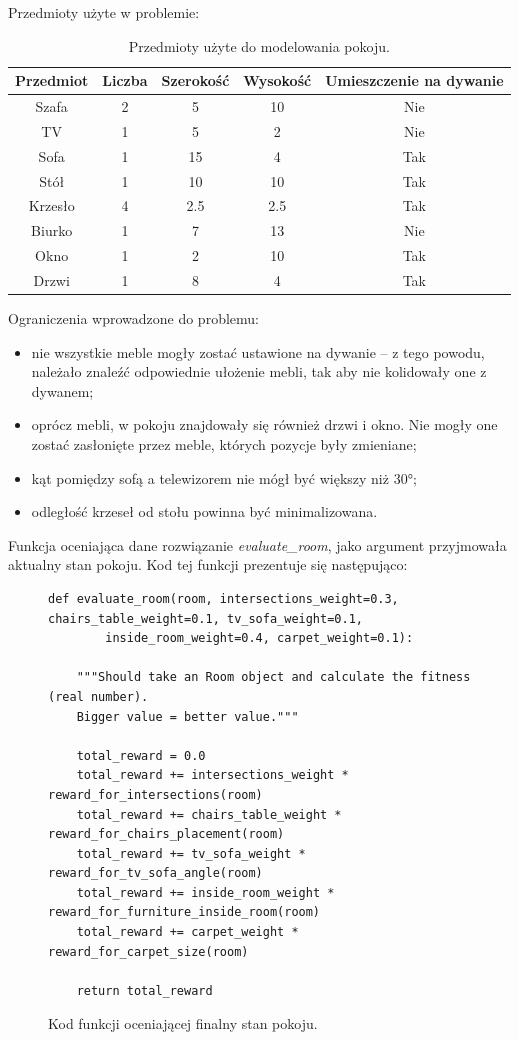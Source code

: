 Przedmioty użyte w problemie:
\begin{table}[H]
	\centering
	\begin{tabular}{|c|c|c|c|c|}
		\hline
		\textbf{Przedmiot} & \textbf{Liczba} & \textbf{Szerokość} & \textbf{Wysokość} & \textbf{Umieszczenie na dywanie} \\
		\hline
		Szafa & 2 & 5 & 10 & Nie \\
		\hline
		TV & 1 & 5 & 2 & Nie \\
		\hline
		Sofa & 1 & 15 & 4 & Tak \\
		\hline
		Stół & 1 & 10 & 10 & Tak \\
		\hline
		Krzesło & 4 & 2.5 & 2.5 & Tak \\
		\hline
		Biurko & 1 & 7 & 13 & Nie \\
		\hline
		Okno & 1 & 2 & 10 & Tak \\
		\hline
		Drzwi & 1 & 8 & 4 & Tak \\
		\hline
	\end{tabular}
	\caption{Przedmioty użyte do modelowania pokoju.}
\end{table}

Ograniczenia wprowadzone do problemu:
\begin{itemize}
	\item nie wszystkie meble mogły zostać ustawione na dywanie -- z tego powodu, należało znaleźć odpowiednie ułożenie mebli, tak aby nie kolidowały one z dywanem;
	\item oprócz mebli, w pokoju znajdowały się również drzwi i okno. Nie mogły one zostać zasłonięte przez meble, których pozycje były zmieniane;
	\item kąt pomiędzy sofą a telewizorem nie mógł być większy niż \ang{30};
	\item odległość krzeseł od stołu powinna być minimalizowana.
\end{itemize}

Funkcja oceniająca dane rozwiązanie \emph{evaluate\_room}, jako argument przyjmowała aktualny stan pokoju. Kod tej funkcji prezentuje się następująco:

\begin{figure}[H]
	\begin{verbatim}
def evaluate_room(room, intersections_weight=0.3, chairs_table_weight=0.1, tv_sofa_weight=0.1,
		inside_room_weight=0.4, carpet_weight=0.1):
		
	"""Should take an Room object and calculate the fitness (real number).
	Bigger value = better value."""
	
	total_reward = 0.0
	total_reward += intersections_weight * reward_for_intersections(room)
	total_reward += chairs_table_weight * reward_for_chairs_placement(room)
	total_reward += tv_sofa_weight * reward_for_tv_sofa_angle(room)
	total_reward += inside_room_weight * reward_for_furniture_inside_room(room)
	total_reward += carpet_weight * reward_for_carpet_size(room)
	
	return total_reward	
	\end{verbatim}
	\caption{Kod funkcji oceniającej finalny stan pokoju.}
\end{figure}

